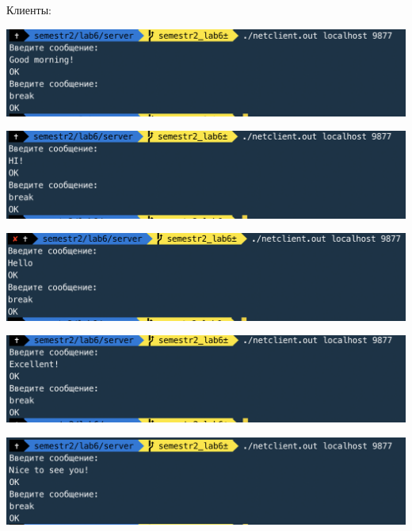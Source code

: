 \documentclass[a4paper,14pt]{extreport} %
\begin{document}
\newpage

Клиенты:

\includegraphics[scale=0.8]{client24}

\includegraphics[scale=0.8]{client25}

\includegraphics[scale=0.8]{client26}

\includegraphics[scale=0.8]{client27}

\includegraphics[scale=0.8]{client28}
\end{document}

